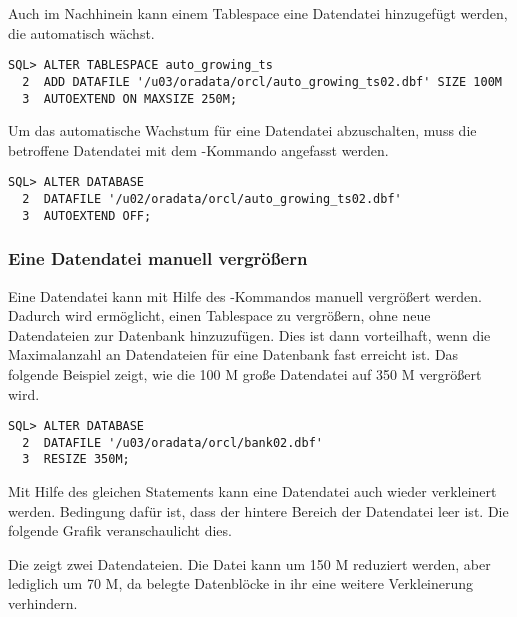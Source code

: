           Auch im Nachhinein kann einem Tablespace eine Datendatei hinzugef\"ugt werden, die automatisch w\"achst.
          \begin{lstlisting}[caption={Hinzuf\"ugen einer Datendatei mit automatischem Wachstum},label=admin124,language=oracle_sql]
SQL> ALTER TABLESPACE auto_growing_ts
  2  ADD DATAFILE '/u03/oradata/orcl/auto_growing_ts02.dbf' SIZE 100M
  3  AUTOEXTEND ON MAXSIZE 250M;
          \end{lstlisting}
          Um das automatische Wachstum f\"ur eine Datendatei abzuschalten, muss die betroffene Datendatei mit dem -Kommando angefasst werden.
          \begin{lstlisting}[caption={Automatisches Wachstum f\"ur eine Datendatei abschalten},label=admin125,language=oracle_sql]
SQL> ALTER DATABASE
  2  DATAFILE '/u02/oradata/orcl/auto_growing_ts02.dbf'
  3  AUTOEXTEND OFF;
          \end{lstlisting}
        \subsubsection{Eine Datendatei manuell vergr\"o\ss{}ern}
          Eine Datendatei kann mit Hilfe des -Kommandos manuell vergr\"o\ss{}ert werden. Dadurch wird erm\"oglicht, einen Tablespace zu vergr\"o\ss{}ern, ohne neue Datendateien zur Datenbank hinzuzuf\"ugen. Dies ist dann vorteilhaft, wenn die Maximalanzahl an Datendateien f\"ur eine Datenbank fast erreicht ist. Das folgende Beispiel zeigt, wie die 100 M gro\ss{}e Datendatei  auf 350 M vergr\"o\ss{}ert wird.
          \begin{lstlisting}[caption={Eine Datendatei manuell vergr\"o\ss{}ern},label=admin126,language=oracle_sql]
SQL> ALTER DATABASE
  2  DATAFILE '/u03/oradata/orcl/bank02.dbf'
  3  RESIZE 350M;
          \end{lstlisting}
          Mit Hilfe des gleichen Statements kann eine Datendatei auch wieder verkleinert werden. Bedingung daf\"ur ist, dass der hintere Bereich der Datendatei leer ist. Die folgende Grafik veranschaulicht dies.

          Die  zeigt zwei Datendateien. Die Datei  kann um 150 M reduziert werden, aber  lediglich um 70 M, da belegte Datenbl\"ocke in ihr eine weitere Verkleinerung verhindern.
